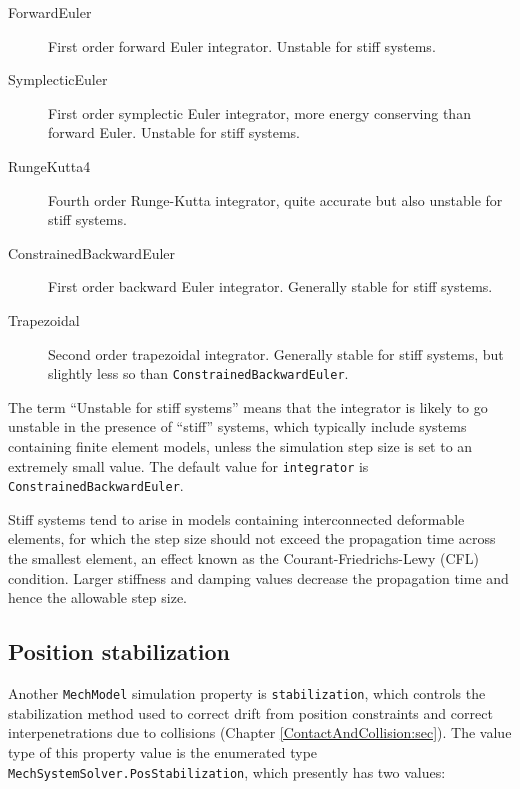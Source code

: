 \begin{description}

\item[ForwardEuler]\mbox{}

First order forward Euler integrator. Unstable for stiff systems.

\item[SymplecticEuler]\mbox{}

First order symplectic Euler integrator, more energy conserving
than forward Euler. Unstable for stiff systems.

\item[RungeKutta4]\mbox{}

Fourth order Runge-Kutta integrator, quite accurate but also unstable
for stiff systems.

\item[ConstrainedBackwardEuler]\mbox{}

First order backward Euler integrator. Generally stable for stiff systems.

\item[Trapezoidal]\mbox{}

Second order trapezoidal integrator. Generally stable for stiff
systems, but slightly less so than\pdfbreak
{\tt ConstrainedBackwardEuler}.

\end{description}

The term ``Unstable for stiff systems'' means that the integrator is
likely to go unstable in the presence of ``stiff'' systems, which
typically include systems containing finite element models, unless the
simulation step size is set to an extremely small value.  The default
value for {\tt integrator} is {\tt ConstrainedBackwardEuler}.

\begin{sideblock}
Stiff systems tend to arise in models containing interconnected
deformable elements, for which the step size should not exceed the
propagation time across the smallest element, an effect known as the
Courant-Friedrichs-Lewy (CFL) condition. Larger stiffness and damping
values decrease the propagation time and hence the allowable step
size.
\end{sideblock}

\subsection{Position stabilization}
\label{PosStabilization:sec}

Another {\tt MechModel} simulation property is {\tt stabilization},
which controls the stabilization method used to correct drift from
position constraints and correct interpenetrations due to collisions
(Chapter \ref{ContactAndCollision:sec}).
The value type of this property value is the enumerated type {\tt
MechSystemSolver.PosStabilization}, which presently has two values:

